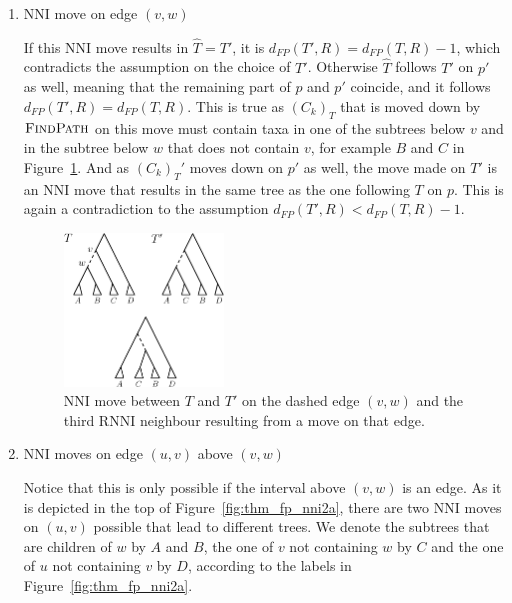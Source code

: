 \documentclass{amsart}
\newcommand{\rnni}{\mathrm{RNNI}}
\newcommand{\findpath}{\textsc{FindPath}}
\newcommand{\nni}{\mathrm{NNI}}
\begin{document}
\begin{enumerate}
    \item $\nni$ move on edge $(v,w)$

    If this $\nni$ move results in $\hat T = T'$, it is $d_{FP}(T',R) = d_{FP}(T,R) - 1$, which contradicts the assumption on the choice of $T'$.
    Otherwise $\hat T$ follows $T'$ on $p'$ as well, meaning that the remaining part of $p$ and $p'$ coincide, and it follows $d_{FP}(T',R) = d_{FP}(T,R)$.
    This is true as $(C_k)_T$ that is moved down by $\findpath$ on this move must contain taxa in one of the subtrees below $v$ and in the subtree below $w$ that does not contain $v$, for example $B$ and $C$ in Figure~\ref{fig:thm_fp_nni1}.
    And as $(C_k)_T'$ moves down on $p'$ as well, the move made on $T'$ is an $\nni$ move that results in the same tree as the one following $T$ on $p$.
    This is again a contradiction to the assumption $d_{FP}(T',R) < d_{FP}(T,R) - 1$.

    \begin{figure}[!hbt]
    \centering
    \includegraphics[width=0.4\textwidth]{thm_fp_nni1}
    \vspace{12pt}
    \caption{$\nni$ move between $T$ and $T'$ on the dashed edge $(v,w)$ and the third $\rnni$ neighbour resulting from a move on that edge.}
    \label{fig:thm_fp_nni1}
    \end{figure}

    \item $\nni$ moves on edge $(u,v)$ above $(v,w)$

    Notice that this is only possible if the interval above $(v,w)$ is an edge.
    As it is depicted in the top of Figure~\ref{fig:thm_fp_nni2a}, there are two $\nni$ moves on $(u,v)$ possible that lead to different trees.
    We denote the subtrees that are children of $w$ by $A$ and $B$, the one of $v$ not containing $w$ by $C$ and the one of $u$ not containing $v$ by $D$, according to the labels in Figure~\ref{fig:thm_fp_nni2a}.


\end{enumerate}
\end{document}
